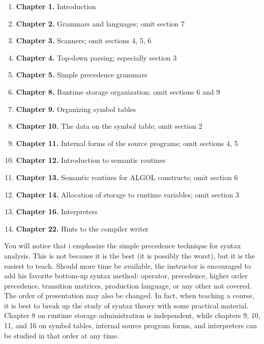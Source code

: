 \documentclass[../main.tex]{subfiles}
\begin{document}
\begin{enumerate}
	
	\item[] \textbf{Chapter 1.}	Introduction
	\item[] \textbf{Chapter 2.}	Grammars and languages; omit section 7
	\item[] \textbf{Chapter 3.} Scanners; omit sections 4, 5, 6	
	\item[] \textbf{Chapter 4.} Top-down parsing; especially section 3	
	\item[] \textbf{Chapter 5.}	Simple precedence grammars
	\item[] \textbf{Chapter 8.}	Runtime storage organization; omit sections 6 and 9
	\item[] \textbf{Chapter 9.}	Organizing symbol tables
	\item[] \textbf{Chapter 10.}	The data on the symbol table; omit section 2
	\item[] \textbf{Chapter 11.}	Internal forms of the source programs; omit sections 4, 5
	\item[] \textbf{Chapter 12.}	Introduction to semantic routines
	\item[] \textbf{Chapter 13.} Semantic routines for ALGOL constructs; omit section 6	
	\item[] \textbf{Chapter 14.}	Allocation of storage to runtime variables; omit section 3
	\item[] \textbf{Chapter 16.}	Interpreters
	\item[] \textbf{Chapter 22.}	Hints to the compiler writer
	
\end{enumerate}

You will notice that i emphasize the simple precedence technique for syntax analysis. This is not because it is the best (it is possibly the worst), but it is the easiest to teach. Should more time be available, the instructor is encouraged to add his favorite bottom-up syntax method: operator, precedence, higher order precedence, transition matrices, production language, or any other not covered.\\

The order of presentation may also be changed. In fact, when teaching a course, it is best to break up the study of syntax theory with some practical material. Chapter 8 on runtime storage administration is independent, while chapters 9, 10, 11, and 16 on symbol tables, internal source program forms, and interpreters can be studied in that order at any time.\\
\end{document}
